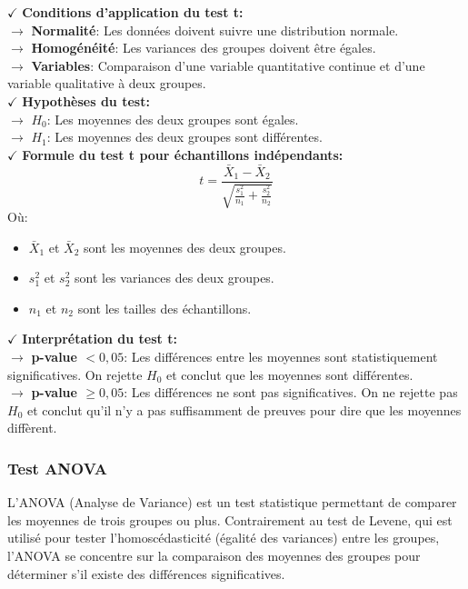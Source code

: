 \textbf{\(\checkmark\)} \textbf{Conditions d'application du test t:}\\
    \textbf{\(\rightarrow\)} \textbf{Normalité}: Les données doivent suivre une distribution normale.\\
    \textbf{\(\rightarrow\)} \textbf{Homogénéité}: Les variances des groupes doivent être égales.\\
    \textbf{\(\rightarrow\)} \textbf{Variables}: Comparaison d'une variable quantitative continue et d'une variable qualitative à deux groupes.\\
\textbf{\(\checkmark\)} \textbf{Hypothèses du test:}\\
    \textbf{\(\rightarrow\)} \( H_0 \): Les moyennes des deux groupes sont égales.\\
    \textbf{\(\rightarrow\)} \( H_1 \): Les moyennes des deux groupes sont différentes.\\

\textbf{\(\checkmark\)} \textbf{Formule du test t pour échantillons indépendants:}
\[
t = \frac{\bar{X}_1 - \bar{X}_2}{\sqrt{\frac{s_1^2}{n_1} + \frac{s_2^2}{n_2}}}
\]
Où:
\begin{itemize}
    \item \( \bar{X}_1 \) et \( \bar{X}_2 \) sont les moyennes des deux groupes.
    \item \( s_1^2 \) et \( s_2^2 \) sont les variances des deux groupes.
    \item \( n_1 \) et \( n_2 \) sont les tailles des échantillons.
\end{itemize}

\textbf{\(\checkmark\)} \textbf{Interprétation du test t:}\\
    \textbf{\(\rightarrow\)} \textbf{p-value \( < 0,05 \)}: Les différences entre les moyennes sont statistiquement significatives. On rejette \( H_0 \) et conclut que les moyennes sont différentes.\\
    \textbf{\(\rightarrow\)} \textbf{p-value \( \geq 0,05 \)}: Les différences ne sont pas significatives. On ne rejette pas \( H_0 \) et conclut qu'il n'y a pas suffisamment de preuves pour dire que les moyennes diffèrent.

\subsubsection{Test ANOVA}

    L'ANOVA (Analyse de Variance) est un test statistique permettant de comparer les moyennes de trois groupes ou plus. Contrairement au test de Levene, qui est utilisé pour tester l'homoscédasticité (égalité des variances) entre les groupes, l'ANOVA se concentre sur la comparaison des moyennes des groupes pour déterminer s'il existe des différences significatives.
    
